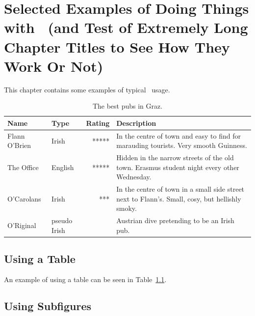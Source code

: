 %
%
% 
% 
% 

\chapter{Selected Examples of Doing Things with \LaTeXe\
(and Test of Extremely
Long Chapter Titles to See How They Work Or Not)
}

\label{chap:SelectedExamples}


This chapter contains some examples of typical \LaTeXe\
usage.





\begin{table}[tp]
\centering
\begin{tabularx}{\linewidth}{|llrX|}
\hline
Name & Type & Rating & Description \\
\hline
Flann O'Brien &
Irish &
***** &
In the centre of town and easy to find for
marauding tourists. Very smooth Guinness.
\\
\hline
The Office &
English &
***** &
Hidden in the narrow streets of the old town.
Erasmus student night every other Wednesday.
\\
\hline
O'Carolans &
Irish &
*** &
In the centre of town in a small side street next to Flann's.
Small, cosy, but hellishly smoky.
\\
\hline
O'Riginal &
pseudo Irish &
 &
Austrian dive pretending to be an Irish pub.
\\
\hline
\end{tabularx}

\caption[Best Pubs in Graz]
{
The best pubs in Graz.
}
\label{tabBestPubs}
\end{table}



\section{Using a Table}

An example of using a table can be seen in Table~\ref{tabBestPubs}.



\section{Using Subfigures}

